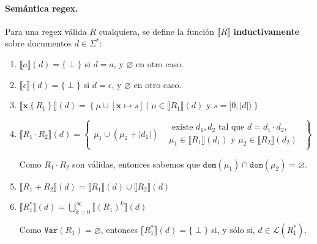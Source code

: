 \paragraph{Semántica regex.} Para una regex válida $R$ cualquiera, se define la función $\llbracket R \rrbracket$ \textbf{inductivamente} sobre documentos $d \in \Sigma^*$:
\begin{enumerate}
    \item $\llbracket a \rrbracket(d)=\{\perp\}$ si $d = a$, y $\varnothing$ en otro caso.
    \item $\llbracket \epsilon \rrbracket(d)=\{\perp\}$ si $d = \epsilon$, y $\varnothing$ en otro caso.
    \item $\llbracket \mathbf{x}\left\{R_1\right\} \rrbracket(d)=\left\{\mu \cup[\mathbf{x} \mapsto s] \mid \mu \in \llbracket R_1 \rrbracket(d) \text { y } s=[0,|d|\rangle\right\}$
    \item $\llbracket R_1 \cdot R_2 \rrbracket(d)=\left\{\begin{array}{l|l}
                  \mu_1 \cup\left(\mu_2+\left|d_1\right|\right) & \begin{array}{l}
                                                                      \text { existe } d_1, d_2 \text { tal que } d=d_1 \cdot d_2, \\
                                                                      \mu_1 \in \llbracket R_1 \rrbracket\left(d_1\right) \text { y } \mu_2 \in \llbracket R_2 \rrbracket\left(d_2\right)
                                                                  \end{array}
              \end{array}\right\}$

          Como $R_1 \cdot R_2$ son válidas, entonces sabemos que $\texttt{dom}(\mu_1) \cap \texttt{dom}(\mu_2) = \varnothing$.

    \item $\llbracket R_1+R_2 \rrbracket(d)=\llbracket R_1 \rrbracket(d) \cup \llbracket R_2 \rrbracket(d)$

    \item $\llbracket R_1^* \rrbracket(d)=\bigcup_{k=0}^{\infty} \llbracket\left(R_1\right)^k \rrbracket(d)$

          Como $\texttt{Var}(R_1) = \varnothing$, entonces $\llbracket R_1^* \rrbracket(d)=\{\perp\}$ si, y sólo si, $d \in \mathcal{L}\left(R_1^*\right)$.
\end{enumerate}

